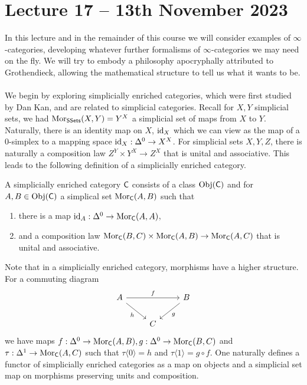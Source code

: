 \section{Lecture 17 -- 13th November 2023}
In this lecture and in the remainder of this course we will consider examples of $\infty$-categories, developing whatever further formalisms of $\infty$-categories we may need on the fly. We will try to embody a philosophy apocryphally attributed to Grothendieck, allowing the mathematical structure to tell us what it wants to be. 
\\\\
We begin by exploring simplicially enriched categories, which were first studied by Dan Kan, and are related to simplicial categories. Recall for $X,Y$ simplicial sets, we had $\mathrm{Mor}_{\mathsf{SSets}}(X,Y)=Y^{X}$ a simplicial set of maps from $X$ to $Y$. Naturally, there is an identity map on $X$, $\mathrm{id}_{X}$ which we can view as the map of a 0-simplex to a mapping space $\mathrm{id}_{X}:\Delta^{0}\to X^{X}$. For simplicial sets $X,Y,Z$, there is naturally a composition law $Z^{Y}\times Y^{X}\to Z^{X}$ that is unital and associative. This leads to the following definition of a simplicially enriched category. 
\begin{definition}\label{def: simplicially enriched category}
    A simplicially enriched category $\mathsf{C}$ consists of a class $\mathrm{Obj}(\mathsf{C})$ and for $A,B\in\mathrm{Obj}(\mathsf{C})$ a simplical set $\mathrm{Mor}_{\mathsf{C}}(A,B)$ such that 
    \begin{enumerate}[label=(\alph*)]
        \item there is a map $\mathrm{id}_{A}:\Delta^{0}\to\mathrm{Mor}_{\mathsf{C}}(A,A)$, 
        \item and a composition law $\mathrm{Mor}_{\mathsf{C}}(B,C)\times\mathrm{Mor}_{\mathsf{C}}(A,B)\to\mathrm{Mor}_{\mathsf{C}}(A,C)$ that is unital and associative. 
    \end{enumerate}
\end{definition}
Note that in a simplicially enriched category, morphisms have a higher structure. For a commuting diagram 
$$%
\begin{tikzcd}
	A && B \\
	& C
	\arrow["h"', from=1-1, to=2-2]
	\arrow["f", from=1-1, to=1-3]
	\arrow["g", from=1-3, to=2-2]
\end{tikzcd}$$
we have maps $f:\Delta^{0}\to\mathrm{Mor}_{\mathsf{C}}(A,B), g:\Delta^{0}\to\mathrm{Mor}_{\mathsf{C}}(B,C)$ and $\tau:\Delta^{1}\to\mathrm{Mor}_{\mathsf{C}}(A,C)$ such that $\tau\langle0\rangle = h$ and $\tau\langle 1\rangle = g\circ f$. One naturally defines a functor of simplicially enriched categories as a map on objects and a simplicial set map on morphisms preserving units and composition. 
